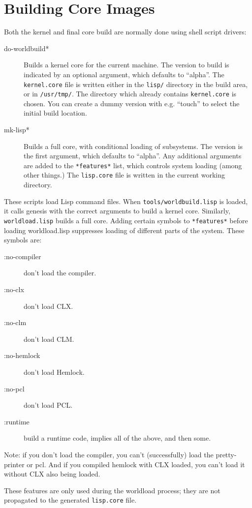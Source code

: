 \section{Building Core Images}
\label{building-cores}
Both the kernel and final core build are normally done using shell script
drivers:
\begin{description}
\item[do-worldbuild*] Builds a kernel core for the current machine.  The
version to build is indicated by an optional argument, which defaults to
``alpha''.  The \verb|kernel.core| file is written either in the \verb|lisp/|
directory in the build area, or in \verb|/usr/tmp/|.  The directory which
already contains \verb|kernel.core| is chosen.  You can create a dummy version
with e.g. ``touch'' to select the initial build location.

\item[mk-lisp*] Builds a full core, with conditional loading of subsystems.
The version is the first argument, which defaults to ``alpha''.  Any additional
arguments are added to the \verb|*features*| list, which controls system
loading (among other things.)  The \verb|lisp.core| file is written in the
current working directory.
\end{description}

These scripts load Lisp command files.  When \verb|tools/worldbuild.lisp| is
loaded, it calls genesis with the correct arguments to build a kernel core.
Similarly, \verb|worldload.lisp|
builds a full core.  Adding certain symbols to \verb|*features*| before
loading worldload.lisp suppresses loading of different parts of the
system.  These symbols are:
\begin{description}
\item[:no-compiler] don't load the compiler.
\item[:no-clx] don't load CLX.
\item[:no-clm] don't load CLM.
\item[:no-hemlock] don't load Hemlock.
\item[:no-pcl] don't load PCL.
\item[:runtime] build a runtime code, implies all of the above, and then some.
\end{description}

Note: if you don't load the compiler, you can't (successfully) load the
pretty-printer or pcl.  And if you compiled hemlock with CLX loaded, you can't
load it without CLX also being loaded.

These features are only used during the worldload process; they are
not propagated to the generated \verb|lisp.core| file. 
